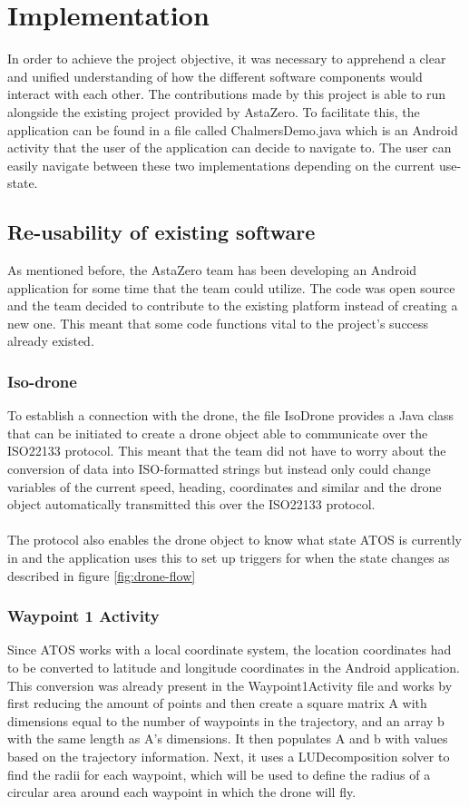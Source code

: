 \chapter{Implementation}
In order to achieve the project objective, it was necessary to apprehend a clear and unified understanding of how the different software components would interact with each other. The contributions made by this project is able to run alongside the existing project provided by AstaZero. To facilitate this, the application can be found in a file called ChalmersDemo.java which is an Android activity that the user of the application can decide to navigate to. The user can easily navigate between these two implementations depending on the current use-state. 
\section{Re-usability of existing software}
As mentioned before, the AstaZero team has been developing an Android application for some time that the team could utilize. The code was open source and the team decided to contribute to the existing platform instead of creating a new one. This meant that some code functions vital to the project's success already existed.

\subsection{Iso-drone}
To establish a connection with the drone, the file IsoDrone  provides a Java class that can be initiated to create a drone object able to communicate over the ISO22133 protocol. This meant that the team did not have to worry about the conversion of data into ISO-formatted strings but instead only could change variables of the current speed, heading, coordinates and similar and the drone object automatically transmitted this over the ISO22133 protocol. 
\\ \\
The protocol also enables the drone object to know what state ATOS is currently in and the application uses this to set up triggers for when the state changes as described in figure \ref{fig:drone-flow}

\subsection{Waypoint 1 Activity}
Since ATOS works with a local coordinate system, the location coordinates had to be converted to latitude and longitude coordinates in the Android application. This conversion was already present in the Waypoint1Activity file and works by first reducing the amount of points and then create a square matrix A with dimensions equal to the number of waypoints in the trajectory, and an array b with the same length as A's dimensions. It then populates A and b with values based on the trajectory information. Next, it uses a LUDecomposition solver to find the radii for each waypoint, which will be used to define the radius of a circular area around each waypoint in which the drone will fly.
\\

